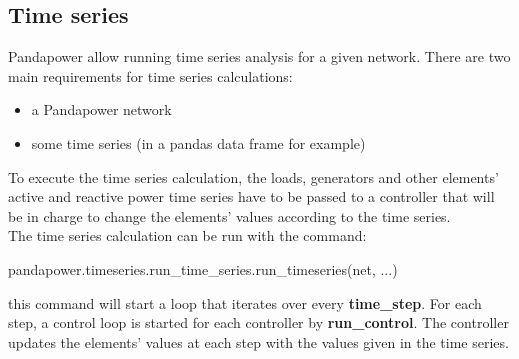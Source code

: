 

\subsection{Time series}
Pandapower allow running time series analysis for a given network. There are two main requirements for time series calculations:
\begin{itemize}
    \item a Pandapower network
    \item some time series (in a pandas data frame for example)
\end{itemize}

To execute the time series calculation, the loads, generators and other elements' active and reactive power time series have to be passed to a controller that will be in charge to change the elements' values according to the time series. \\

The time series calculation can be run with the command: 
\begin{algorithm}[h]
\state pandapower.timeseries.run\_time\_series.run\_timeseries(net, ...)
\end{algorithm}

\noindent this command will start a loop that iterates over every \textbf{time\_step}. For each step, a control loop is started for each controller by \textbf{run\_control}. The controller updates the elements' values at each step with the values given in the time series.


